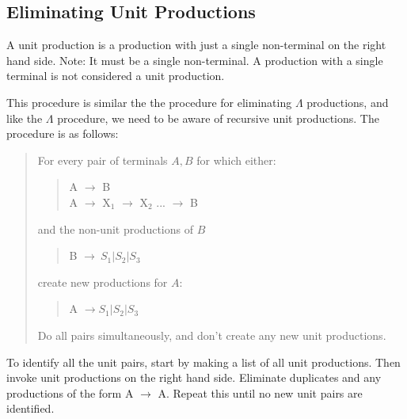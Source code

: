 \documentclass[letterpaper,12pt,openany,reqno]{book}%
\begin{document}
\subsection{Eliminating Unit Productions}
A unit production is a production with just a single non-terminal on the right hand side. Note: It must be a single non-terminal. A production with a single terminal is not considered a unit production.

This procedure is similar the the procedure for eliminating $\Lambda$ productions, and like the $\Lambda$ procedure, we need to be aware of recursive unit productions. The procedure is as follows:
\begin{quote}
For every pair of terminals $A, B$ for which either:
\begin{quote}
{\ttfamily A} $\rightarrow$ {\ttfamily B}\\
{\ttfamily A} $\rightarrow$ {\ttfamily X$_1$} $\rightarrow$ {\ttfamily X$_2$} ... $\rightarrow$ {\ttfamily B}\\
\end{quote}
and the non-unit productions of $B$ 
\begin{quote}
{\ttfamily B} $\rightarrow\ S_1 | S_2 | S_3$
\end{quote}
create new productions for $A$:
\begin{quote}
{\ttfamily A} $\rightarrow S_1 | S_2 | S_3$\\
\end{quote}
Do all pairs simultaneously, and don't create any new unit productions.
\end{quote}

To identify all the unit pairs, start by making a list of all unit productions. Then invoke unit productions on the right hand side. Eliminate duplicates and any productions of the form {\ttfamily A} $\rightarrow$ {\ttfamily A}. Repeat this until no new unit pairs are identified.
\end{document}
